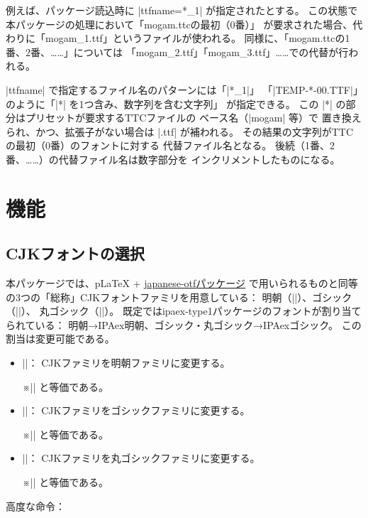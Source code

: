 \documentclass[a4paper]{ltjsarticle}
\newcommand{\Pkg}[1]{\textsf{#1}}
\newcommand{\Meta}[1]{$\langle$\mbox{}#1\mbox{}$\rangle$}
\newcommand{\Note}{\par\noindent ※}
\newcommand{\Means}{：\quad}
\providecommand{\pLaTeX}{p\LaTeX}
\begin{document}
例えば、パッケージ読込時に |ttfname=*_1| が指定されたとする。
この状態で本パッケージの処理において「mogam.ttcの最初（0番）」
が要求された場合、代わりに「mogam\_1.ttf」というファイルが使われる。
同様に、「mogam.ttcの1番、2番、……」については
「mogam\_2.ttf」「mogam\_3.ttf」……での代替が行われる。

|ttfname| で指定するファイル名のパターンには「|*_1|」
「|TEMP-*-00.TTF|」のように「|*| を1つ含み、数字列を含む文字列」
が指定できる。
この |*| の部分はプリセットが要求するTTCファイルの
ベース名（|mogam| 等）で
置き換えられ、かつ、拡張子がない場合は |.ttf| が補われる。
その結果の文字列がTTCの最初（0番）のフォントに対する
代替ファイル名となる。
後続（1番、2番、……）の代替ファイル名は数字部分を
インクリメントしたものになる。

\section{機能}
\label{sec:usage}

\subsection{CJKフォントの選択}

本パッケージでは、{\pLaTeX} +
\href{http://www.ctan.org/pkg/japanese-otf}{\Pkg{japanese-otf}パッケージ}%
で用いられるものと同等の3つの「総称」CJKフォントファミリを用意している：
明朝（|\mcfamily|）、ゴシック（|\gtfamily|）、
丸ゴシック（|\mgfamily|）。
既定では\Pkg{ipaex-type1}パッケージのフォントが割り当てられている：
明朝→IPAex明朝、ゴシック・丸ゴシック→IPAexゴシック。
この割当は変更可能である。

\begin{itemize}
\item |\mcfamily|\Means
  CJKファミリを明朝ファミリに変更する。
  \Note || と等価である。
\item |\gtfamily|\Means
  CJKファミリをゴシックファミリに変更する。
  \Note || と等価である。
\item |\mgfamily|\Means
  CJKファミリを丸ゴシックファミリに変更する。
  \Note || と等価である。
\end{itemize}

高度な命令\Means

\end{document}
